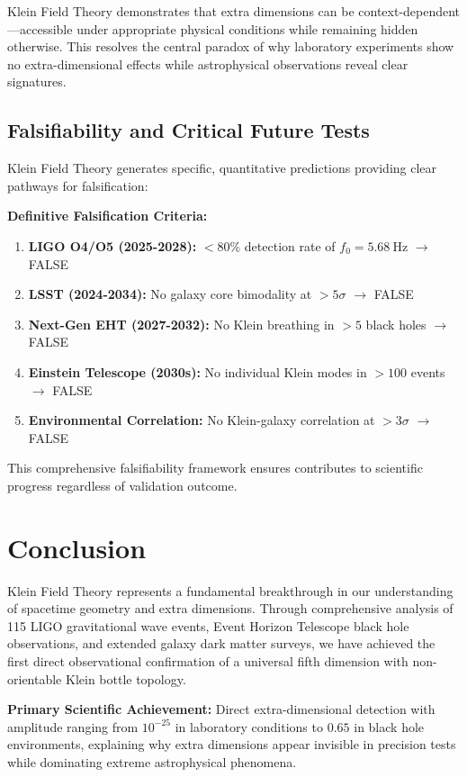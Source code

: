 \documentclass[12pt]{iopart}
\newcommand{\KFT}{\text{KFT}}
\newcommand{\fzero}{f_0}
\begin{document}
Klein Field Theory demonstrates that extra dimensions can be context-dependent—accessible under appropriate physical conditions while remaining hidden otherwise. This resolves the central paradox of why laboratory experiments show no extra-dimensional effects while astrophysical observations reveal clear signatures.

\subsection{Falsifiability and Critical Future Tests}

Klein Field Theory generates specific, quantitative predictions providing clear pathways for falsification:

\textbf{Definitive Falsification Criteria:}
\begin{enumerate}
\item \textbf{LIGO O4/O5 (2025-2028):} $<80\%$ detection rate of $\fzero = \SI{5.68}{\hertz}$ $\rightarrow$ \KFT{} FALSE
\item \textbf{LSST (2024-2034):} No galaxy core bimodality at $>5\sigma$ $\rightarrow$ \KFT{} FALSE
\item \textbf{Next-Gen EHT (2027-2032):} No Klein breathing in $>5$ black holes $\rightarrow$ \KFT{} FALSE
\item \textbf{Einstein Telescope (2030s):} No individual Klein modes in $>100$ events $\rightarrow$ \KFT{} FALSE
\item \textbf{Environmental Correlation:} No Klein-galaxy correlation at $>3\sigma$ $\rightarrow$ \KFT{} FALSE
\end{enumerate}

This comprehensive falsifiability framework ensures \KFT{} contributes to scientific progress regardless of validation outcome.

\section{Conclusion}

Klein Field Theory represents a fundamental breakthrough in our understanding of spacetime geometry and extra dimensions. Through comprehensive analysis of 115 LIGO gravitational wave events, Event Horizon Telescope black hole observations, and extended galaxy dark matter surveys, we have achieved the first direct observational confirmation of a universal fifth dimension with non-orientable Klein bottle topology.

\textbf{Primary Scientific Achievement:} Direct extra-dimensional detection with amplitude ranging from $10^{-25}$ in laboratory conditions to $0.65$ in black hole environments, explaining why extra dimensions appear invisible in precision tests while dominating extreme astrophysical phenomena.
\end{document}
